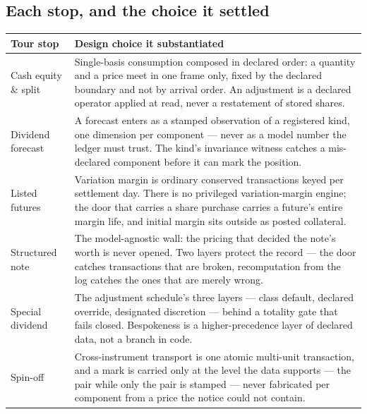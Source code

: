 \subsection{Each stop, and the choice it settled}

\begin{center}
\renewcommand{\arraystretch}{1.35}
\begin{tabular}{@{}p{3.5cm}p{10.5cm}@{}}
\toprule
\textbf{Tour stop} & \textbf{Design choice it substantiated} \\
\midrule
Cash equity \& split
& Single-basis consumption composed in declared order: a quantity and a price meet
in one frame only, fixed by the declared boundary and not by arrival order. An
adjustment is a declared operator applied at read, never a restatement of stored
shares. \\

Dividend forecast
& A forecast enters as a stamped observation of a registered kind, one dimension per
component --- never as a model number the ledger must trust. The kind's invariance
witness catches a mis-declared component before it can mark the position. \\

Listed futures
& Variation margin is ordinary conserved transactions keyed per settlement day. There
is no privileged variation-margin engine; the door that carries a share purchase
carries a future's entire margin life, and initial margin sits outside as posted
collateral. \\

Structured note
& The model-agnostic wall: the pricing that decided the note's worth is never opened.
Two layers protect the record --- the door catches transactions that are broken,
recomputation from the log catches the ones that are merely wrong. \\

Special dividend
& The adjustment schedule's three layers --- class default, declared override,
designated discretion --- behind a totality gate that fails closed. Bespokeness is a
higher-precedence layer of declared data, not a branch in code. \\

Spin-off
& Cross-instrument transport is one atomic multi-unit transaction, and a mark is
carried only at the level the data supports --- the pair while only the pair is
stamped --- never fabricated per component from a price the notice could not contain. \\


\end{tabular}
\end{center}
